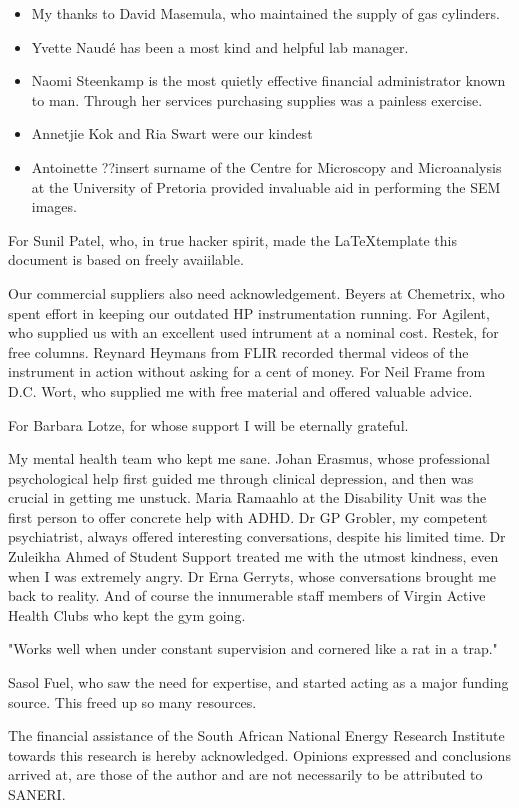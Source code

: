\documentclass[
11pt, %
english, %
singlespacing, %
headsepline, %
]{MastersDoctoralThesis} %
\begin{document}
\begin{acknowledgements}
\begin{itemize}
\item My thanks to David Masemula, who maintained the supply of gas cylinders.

\item Yvette Naudé has been a most kind and helpful lab manager.

\item Naomi Steenkamp is the most quietly effective financial administrator known to
man. Through her services purchasing supplies was a painless exercise.
\item Annetjie Kok and Ria Swart were our kindest

\item Antoinette ??insert surname of the Centre for Microscopy and Microanalysis at
the University of Pretoria provided invaluable aid in performing the SEM images.

\end{itemize}

For Sunil Patel, who, in true hacker spirit, made the \LaTeX template this
document is based on freely avaiilable.

Our commercial suppliers also need acknowledgement. Beyers at Chemetrix, who
spent effort in keeping our outdated HP instrumentation running. For Agilent,
who supplied us with an excellent used intrument at a nominal cost. Restek, for
free columns. Reynard Heymans from FLIR recorded thermal videos of the
instrument in action without asking for a cent of money. For Neil Frame from
D.C. Wort, who supplied me with free material and offered valuable advice.

For Barbara Lotze, for whose support I will be eternally grateful. 

My mental health team who kept me sane. Johan Erasmus, whose professional
psychological help first guided me through clinical depression, and then was
crucial in getting me unstuck. Maria Ramaahlo at the Disability Unit was the
first person to offer concrete help with ADHD. Dr GP Grobler, my competent
psychiatrist, always offered interesting conversations, despite his limited
time. Dr Zuleikha Ahmed of Student Support treated me with the
utmost kindness, even when I was extremely angry. Dr Erna Gerryts, whose
conversations brought me back to reality. And of course the innumerable staff
members of Virgin Active Health Clubs who kept the gym going. 

 "Works well when under constant supervision and cornered like a rat in a trap."


Sasol Fuel, who saw the need for expertise, and started acting as a major
funding source. This freed up so many resources.

The financial assistance of the South African National Energy Research Institute
towards this research is hereby acknowledged. Opinions expressed and conclusions
arrived at, are those of the author and are not necessarily to be attributed to
SANERI.

\end{acknowledgements}
\end{document}
